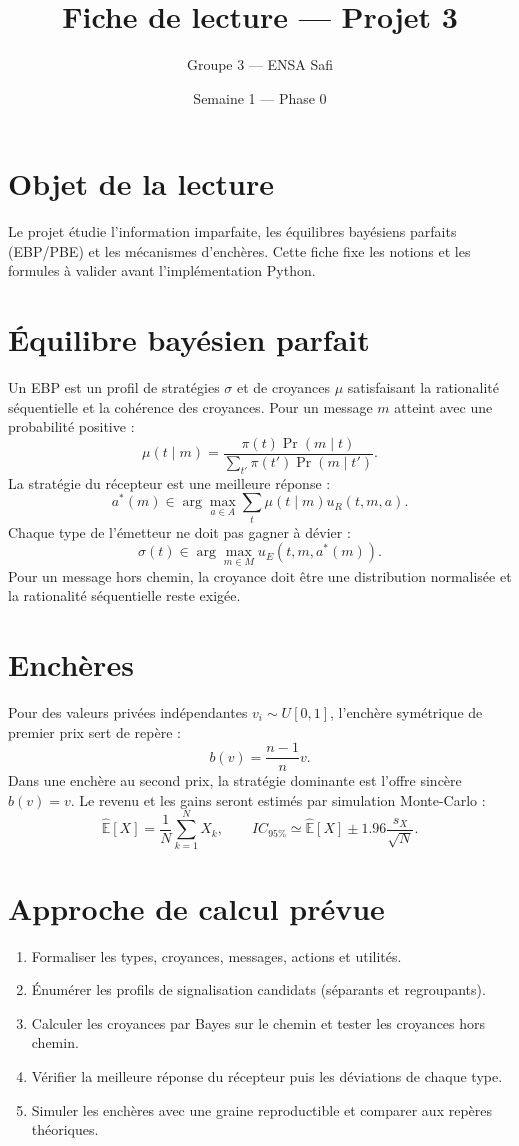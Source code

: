 \documentclass[11pt,a4paper]{article}
\title{Fiche de lecture — Projet 3}
\author{Groupe 3 — ENSA Safi}
\date{Semaine 1 — Phase 0}
\begin{document}
\maketitle

\section{Objet de la lecture}
Le projet étudie l'information imparfaite, les équilibres bayésiens parfaits
(EBP/PBE) et les mécanismes d'enchères. Cette fiche fixe les notions et les
formules à valider avant l'implémentation Python.

\section{Équilibre bayésien parfait}
Un EBP est un profil de stratégies $\sigma$ et de croyances $\mu$ satisfaisant
la rationalité séquentielle et la cohérence des croyances. Pour un message $m$
atteint avec une probabilité positive :
\[
\mu(t\mid m)=\frac{\pi(t)\Pr(m\mid t)}
{\sum_{t'}\pi(t')\Pr(m\mid t')}.
\]
La stratégie du récepteur est une meilleure réponse :
\[
a^*(m)\in\arg\max_{a\in A}\sum_t\mu(t\mid m)u_R(t,m,a).
\]
Chaque type de l'émetteur ne doit pas gagner à dévier :
\[
\sigma(t)\in\arg\max_{m\in M}u_E(t,m,a^*(m)).
\]
Pour un message hors chemin, la croyance doit être une distribution
normalisée et la rationalité séquentielle reste exigée.

\section{Enchères}
Pour des valeurs privées indépendantes $v_i\sim U[0,1]$, l'enchère symétrique
de premier prix sert de repère :
\[
b(v)=\frac{n-1}{n}v.
\]
Dans une enchère au second prix, la stratégie dominante est l'offre sincère
$b(v)=v$. Le revenu et les gains seront estimés par simulation Monte-Carlo :
\[
\widehat{\mathbb E}[X]=\frac{1}{N}\sum_{k=1}^{N}X_k,\qquad
IC_{95\%}\simeq \widehat{\mathbb E}[X]\pm1.96\frac{s_X}{\sqrt N}.
\]

\section{Approche de calcul prévue}
\begin{enumerate}
  \item Formaliser les types, croyances, messages, actions et utilités.
  \item Énumérer les profils de signalisation candidats (séparants et
        regroupants).
  \item Calculer les croyances par Bayes sur le chemin et tester les croyances
        hors chemin.
  \item Vérifier la meilleure réponse du récepteur puis les déviations de
        chaque type.
  \item Simuler les enchères avec une graine reproductible et comparer aux
        repères théoriques.
\end{enumerate}
\end{document}
